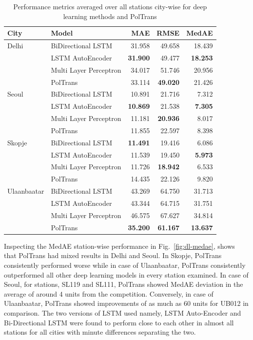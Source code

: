 \documentclass[10pt,journal]{IEEEtran}
\begin{document}
\begin{table}[h]
\small
\centering
\tabcolsep=0.16cm
\caption{Performance metrics averaged over all stations city-wise for deep learning methods and PolTrans}
\label{tbl:dl-performance}
\begin{tabular}{llrrr}
\toprule
City & Model & MAE & RMSE & MedAE \\
\midrule
Delhi & BiDirectional LSTM & 31.958 & 49.658 & 18.439 \\
& LSTM AutoEncoder & \textbf{31.900} & 49.477 & \textbf{18.253} \\
& Multi Layer Perceptron & 34.017 & 51.746 & 20.956 \\
& PolTrans & 33.114 & \textbf{49.020} & 21.426 \\
Seoul & BiDirectional LSTM & 10.891 & 21.716 & 7.312 \\
& LSTM AutoEncoder & \textbf{10.869} & 21.538 & \textbf{7.305} \\
& Multi Layer Perceptron & 11.181 & \textbf{20.936} & 8.017 \\
& PolTrans & 11.855 & 22.597 & 8.398 \\
Skopje & BiDirectional LSTM & \textbf{11.491} & 19.416 & 6.086 \\
& LSTM AutoEncoder & 11.539 & 19.450 & \textbf{5.973} \\
& Multi Layer Perceptron & 11.726 & \textbf{18.942} & 6.533 \\
& PolTrans & 14.435 & 22.126 & 9.820 \\
Ulaanbaatar & BiDirectional LSTM & 43.269 & 64.750 & 31.713 \\
& LSTM AutoEncoder & 43.344 & 64.715 & 31.751 \\
& Multi Layer Perceptron & 46.575 & 67.627 & 34.814 \\
& PolTrans & \textbf{35.200} & \textbf{61.167} & \textbf{13.637} \\
\bottomrule
\end{tabular}
\end{table}

Inspecting the MedAE station-wise performance in Fig.~\ref{fig:dl-medae}, shows that {PolTrans} had mixed results in Delhi and Seoul. In Skopje, {PolTrans} consistently performed worse while in case of Ulaanbaatar, {PolTrans} consistently outperformed all other deep learning models in every station examined. In case of Seoul, for stations, SL119 and SL111, {PolTrans} showed MedAE deviation in the average of around 4 units from the competition. Conversely, in case of Ulaanbaatar, {PolTrans} showed improvements of as much as 60 units for UB012 in comparison. The two versions of LSTM used namely, LSTM Auto-Encoder and Bi-Directional LSTM were found to perform close to each other in almost all stations for all cities with minute differences separating the two.
\end{document}
